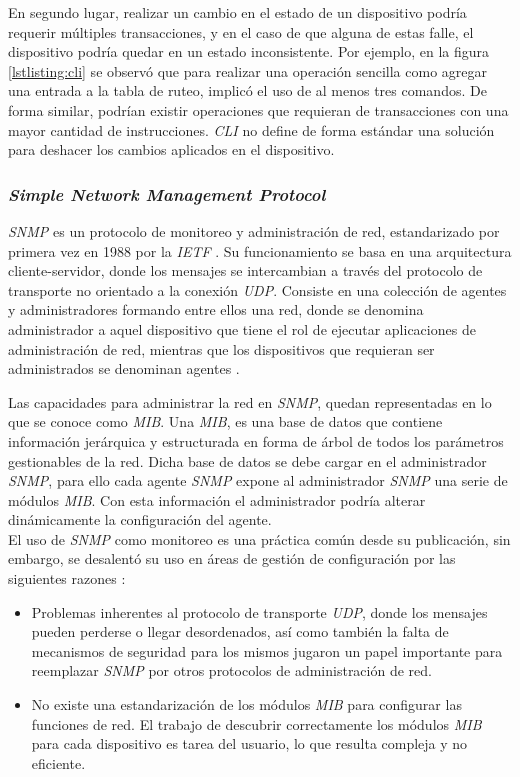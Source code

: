   En segundo lugar, realizar un cambio en el estado de un dispositivo podría requerir múltiples transacciones, y en el caso de que alguna de estas falle, el dispositivo podría quedar en un estado inconsistente. Por ejemplo, en la figura \ref{lstlisting:cli} se observó que para realizar una operación sencilla como agregar una entrada a la tabla de ruteo, implicó el uso de al menos tres comandos. De forma similar, podrían existir operaciones que requieran de transacciones con una mayor cantidad de instrucciones. \textit{CLI} no define de forma estándar una solución para deshacer los cambios aplicados en el dispositivo.

  \subsubsection{\textit{Simple Network Management Protocol}}
  \textit{SNMP} es un protocolo de monitoreo y administración de red, estandarizado por primera vez en 1988 por la \textit{IETF} \parencite{snmprfc}. Su funcionamiento se basa en una arquitectura cliente-servidor, donde los mensajes se intercambian a través del protocolo de transporte no orientado a la conexión \textit{UDP}. Consiste en una colección de agentes y administradores formando entre ellos una red, donde se denomina administrador a aquel dispositivo que tiene el rol de ejecutar aplicaciones de administración de red, mientras que los dispositivos que requieran ser administrados se denominan agentes \parencite{snmprfcfunc}.

  Las capacidades para administrar la red en \textit{SNMP}, quedan representadas en lo que se conoce como \textit{MIB}. Una \textit{MIB}, es una base de datos que contiene información jerárquica y estructurada en forma de árbol de todos los parámetros gestionables de la red. 
  Dicha base de datos se debe cargar en el administrador \textit{SNMP}, para ello cada agente \textit{SNMP} expone al administrador \textit{SNMP} una serie de módulos \textit{MIB}. Con esta información el administrador podría alterar dinámicamente la configuración del agente. 
  \\

  El uso de \textit{SNMP} como monitoreo es una práctica común desde su publicación, sin embargo, se desalentó su uso en áreas de gestión de configuración por las siguientes razones \parencite{snmplimitacion}: 

  \begin{itemize}
	\item Problemas inherentes al protocolo de transporte \textit{UDP}, donde los mensajes pueden perderse o llegar desordenados, así como también la falta de mecanismos de seguridad para los mismos jugaron un papel importante para reemplazar \textit{SNMP} por otros protocolos de administración de red.
	\item No existe una estandarización de los módulos \textit{MIB} para configurar las funciones de red. El trabajo de descubrir correctamente los módulos \textit{MIB} para cada dispositivo es tarea del usuario, lo que resulta compleja y no eficiente.
\end{itemize}

